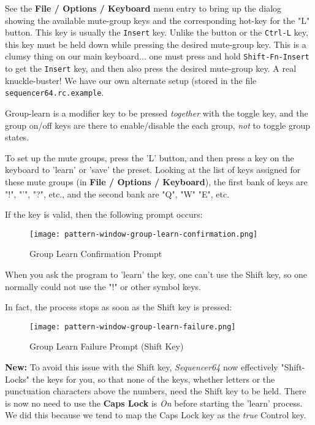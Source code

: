    See the \textbf{File / Options / Keyboard} menu entry to bring up the
   dialog showing the available mute-group keys and the corresponding
   hot-key for the "L" button.
   This key is usually the \texttt{Insert} key.  Unlike the button or the
   \texttt{Ctrl-L} key, this key must be held down while pressing the desired
   mute-group key.
   This is a clumsy thing on our main keyboard... one must press and hold
   \texttt{Shift-Fn-Insert} to get the \texttt{Insert} key, and then also
   press the desired mute-group key.  A real knuckle-buster!
   We have our own alternate setup (stored in the file
   \texttt{sequencer64.rc.example}.

   Group-learn is a modifier key to be pressed \textsl{together}
   with the toggle key, and the group on/off keys are there to enable/disable
   the each group, \textsl{not} to toggle group states.

   To set up the mute groups, press the 'L' button, and then press a key on
   the keyboard to 'learn' or 'save' the preset. Looking at the list of keys
   assigned for these mute groups (in \textbf{File / Options / Keyboard}),
   the first bank of keys are "!", "'", "?", etc., and the second bank are
   "Q", "W" "E", etc.

   If the key is valid, then the following prompt occurs:

\begin{figure}[H]
   \centering 
   \texttt{[image: pattern-window-group-learn-confirmation.png]}
   \caption{Group Learn Confirmation Prompt}
   \label{fig:pattern_window_group_learn_confirmation}
\end{figure}
   
   When you ask the program to 'learn' the key, one can't
   use the Shift key, so one normally could not use the "!" or
   other symbol keys.

   In fact, the process stops as soon as the Shift key is pressed:

\begin{figure}[H]
   \centering 
   \texttt{[image: pattern-window-group-learn-failure.png]}
   \caption{Group Learn Failure Prompt (Shift Key)}
   \label{fig:pattern_window_group_learn_failure}
\end{figure}

   \textbf{New:}
   To avoid this issue with the Shift key, \textsl{Sequencer64} now effectively
   "Shift-Locks" the keys for you, so that none of the keys, whether letters or
   the punctuation characters above the numbers, need the Shift key to be held.
   There is now no need to use the \textbf{Caps Lock} is \textsl{On} before
   starting the 'learn' process.  We did this because we tend to map the
   Caps Lock key as the \textsl{true} Control key.

